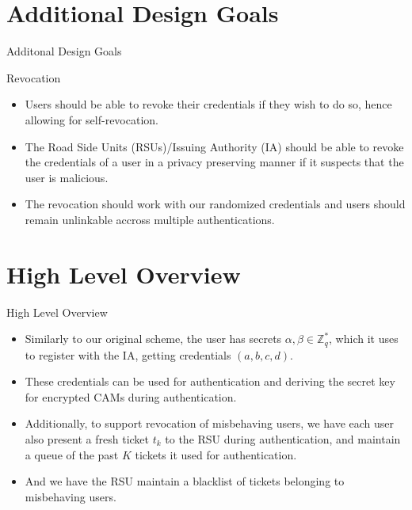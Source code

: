 \documentclass[
	xcolor={svgnames},
	hyperref={pagebackref,bookmarks},
	aspectratio=43,
]{beamer}
\begin{document}
\section{Additional Design Goals}
\begin{frame}{Additonal Design Goals}
	\begin{block}{Revocation}
		\begin{itemize}
			\item Users should be able to revoke their credentials if they wish to do so, hence allowing for self-revocation.
			\item The Road Side Units (RSUs)/Issuing Authority (IA) should be able to revoke the credentials of a user in a privacy preserving manner if it suspects that the user is malicious.
			\item The revocation should work with our randomized credentials and users should remain unlinkable accross multiple authentications.
		\end{itemize}
	\end{block}
\end{frame}

\section{High Level Overview}
\begin{frame}{High Level Overview}
	\begin{itemize}
		\item Similarly to our original scheme, the user has secrets $\alpha, \beta \in \mathbb{Z}_q^*$, which it uses to register with the IA, getting credentials $(a, b, c, d)$.
		\item These credentials can be used for authentication and deriving the secret key for encrypted CAMs during authentication.
		\item<alert@+> Additionally, to support revocation of misbehaving users, we have each user also present a fresh ticket $t_k$ to the RSU during authentication, and maintain a queue of the past $K$ tickets it used for authentication.
		\item<alert@+> And we have the RSU maintain a blacklist of tickets belonging to misbehaving users.
	\end{itemize} 
\end{frame}
\end{document}
